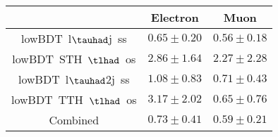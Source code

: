 \centering
\begin{tabular}{|c|c|c|} \hline
 & Electron & Muon\\\hline
lowBDT~l$\tauhad$j~ss & $0.65\pm0.20$ & $0.56\pm0.18$\\\hline
lowBDT~STH~$\tlhad$~os & $2.86\pm1.64$ & $2.27\pm2.28$\\\hline
lowBDT~l$\tauhad$2j~ss & $1.08\pm0.83$ & $0.71\pm0.43$\\\hline
lowBDT~TTH~$\tlhad$~os & $3.17\pm2.02$ & $0.65\pm0.76$\\\hline
Combined & $0.73\pm0.41$ & $0.59\pm0.21$\\\hline
\end{tabular}
